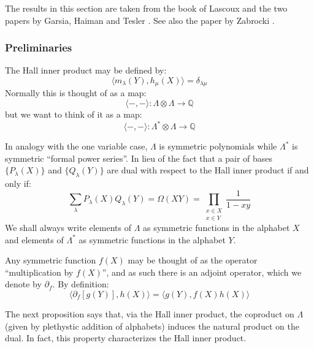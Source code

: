 \documentclass[12pt,dvips]{amsart}
\begin{document}
\par\bigskip

The results in this section are taken from the book of Lascoux \cite{LASCOUX} and the two papers by Garsia, Haiman and Tesler \cite{GARSIA2, GARSIA1}. See also the paper by Zabrocki \cite{ZABROCKI}.


\subsubsection{Preliminaries}
The Hall inner product may be defined by:
$$ \langle m_\lambda(Y), h_\mu(X) \rangle = \delta_{\lambda \mu} $$
Normally this is thought of as a map:
$$ \langle - , - \rangle : \Lambda \otimes \Lambda \to \mathbb{Q} $$
but we want to think of it as a map:
$$ \langle - , - \rangle : \Lambda^* \otimes \Lambda \to \mathbb{Q} $$

In analogy with the one variable case, $\Lambda$ is symmetric polynomials while $\Lambda^*$ is symmetric ``formal power series''. In lieu of the fact that a pair of bases $\{P_\lambda(X)\}$ and $\{Q_\lambda(Y)\}$ are dual with respect to the Hall inner product if and only if:
$$ \sum_\lambda P_\lambda(X) Q_\lambda(Y) = \Omega(XY) = \prod_{\substack{x \in X \\ x \in Y}} \frac{1}{1-xy}	$$
We shall always write elements of $\Lambda$ as symmetric functions in the alphabet $X$ and elements of $\Lambda^*$ as symmetric functions in the alphabet $Y$.




\par\bigskip

Any symmetric function $f(X)$ may be thought of as the operator ``multiplication by $f(X)$'', and as such there is an adjoint operator, which we denote by $\partial_{f}$. By definition:
$$ \langle \partial_{f}[g(Y)], h(X) \rangle = \langle g(Y), f(X) h(X) \rangle $$

The next proposition says that, via the Hall inner product, the coproduct on $\Lambda$ (given by plethystic addition of alphabets) induces the natural product on the dual. In fact, this property characterizes the Hall inner product.
\end{document}
